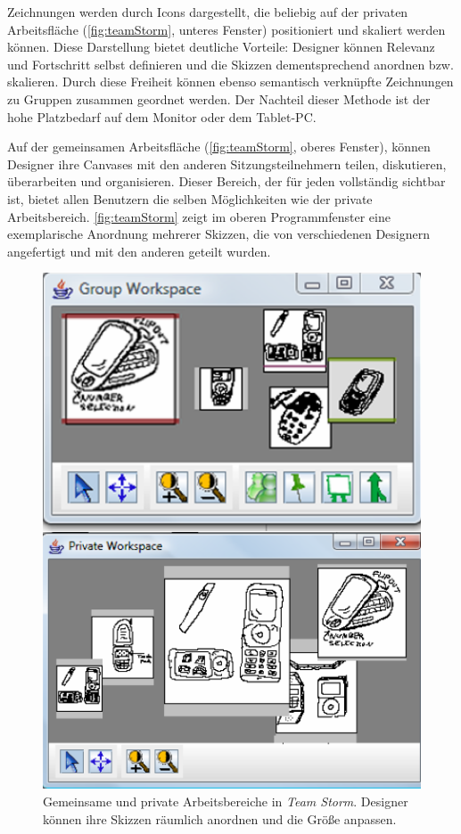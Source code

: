 Zeichnungen werden durch Icons dargestellt, die beliebig auf der privaten Arbeitsfläche (\autoref{fig:teamStorm}, unteres Fenster) positioniert und skaliert werden können. Diese Darstellung bietet deutliche Vorteile: Designer können Relevanz und Fortschritt selbst definieren und die Skizzen dementsprechend anordnen bzw. skalieren. Durch diese Freiheit können ebenso semantisch verknüpfte Zeichnungen zu Gruppen zusammen geordnet werden. Der Nachteil dieser Methode ist der hohe Platzbedarf auf dem Monitor oder dem Tablet-PC.

Auf der gemeinsamen Arbeitsfläche (\autoref{fig:teamStorm}, oberes Fenster), können Designer ihre Canvases mit den anderen Sitzungsteilnehmern teilen, diskutieren, überarbeiten und organisieren. Dieser Bereich, der für jeden vollständig sichtbar ist, bietet allen Benutzern die selben Möglichkeiten wie der private Arbeitsbereich. \autoref{fig:teamStorm} zeigt im oberen Programmfenster eine exemplarische Anordnung mehrerer Skizzen, die von verschiedenen Designern angefertigt und mit den anderen geteilt wurden. \\

\begin{figure}[bth]
	\includegraphics[width=\linewidth]{gfx/teamStormPrivateWorkspace.png}
	\caption{Gemeinsame und private Arbeitsbereiche in \emph{Team Storm}. Designer können ihre Skizzen räumlich anordnen und die Größe anpassen.}
	\label{fig:teamStorm}
\end{figure}

